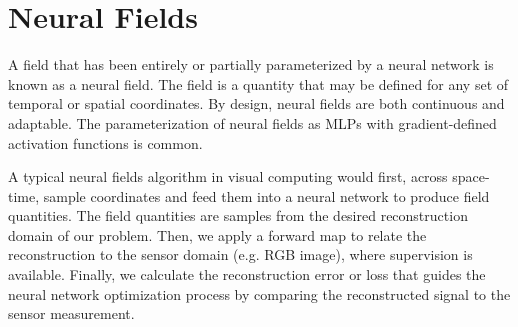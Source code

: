 

\begin{comment}
\subsection{Alpha compositing}
Alpha compositing is the process of combining one image with a background to create the appearance of partial or full transparency \cite{wiki:Alpha_compositing}.

\subsection{Ray marching}
\end{comment}



\section{Neural Fields} %
A field that has been entirely or partially parameterized by a neural network is known as a neural field. The field is a quantity that may be defined for any set of temporal or spatial coordinates. By design, neural fields are both continuous and adaptable. The parameterization of neural fields as MLPs with gradient-defined activation functions is common\cite{xie_neural_2022}.

A typical neural fields algorithm in visual computing would first, across space-time, sample coordinates and feed them into a neural network to produce field quantities. The field quantities are samples from the desired reconstruction domain of our problem. Then, we apply a forward map to relate the reconstruction to the sensor domain (e.g. RGB image), where supervision is available. Finally, we calculate the reconstruction error or loss that guides the neural network optimization process by comparing the reconstructed signal to the sensor measurement.



